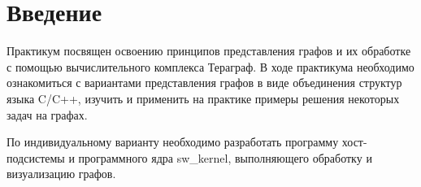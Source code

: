 \chapter*{Введение}

Практикум посвящен освоению принципов представления графов и их обработке с помощью вычислительного комплекса Тераграф. 
В ходе практикума необходимо ознакомиться с вариантами представления графов в виде объединения структур языка C/C++, изучить 
и применить на практике примеры решения некоторых задач на графах. 

По индивидуальному варианту необходимо разработать программу 
хост-подсистемы и программного ядра sw\_kernel, выполняющего обработку и визуализацию графов.

